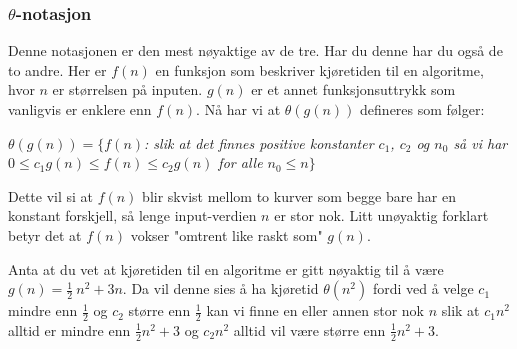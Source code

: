 \subsubsection{$\theta$-notasjon}
Denne notasjonen er den mest nøyaktige av de tre. Har du denne har du også de to andre. Her er $f(n)$ en funksjon som beskriver kjøretiden til en algoritme, hvor $n$ er størrelsen på inputen. $g(n)$ er et annet funksjonsuttrykk som vanligvis er enklere enn $f(n)$. Nå har vi at $\theta(g(n))$ defineres som følger:

\begin{center}
\textit{$\theta(g(n)) = \{ f(n)$: slik at det finnes positive konstanter $c_1$, $c_2$ og $n_0$ så vi har $0 \leq c_1 g(n) \leq f(n) \leq c_2 g(n)$ for alle $n_0 \leq n \}$}
\end{center}

\noindent Dette vil si at $f(n)$ blir skvist mellom to kurver som begge bare har en konstant forskjell, så lenge input-verdien $n$ er stor nok. Litt unøyaktig forklart betyr det at $f(n)$ vokser "omtrent like raskt som" $g(n)$.

\begin{boxed}
Anta at du vet at kjøretiden til en algoritme er gitt nøyaktig til å være $g(n) = \frac{1}{2}\ n^2 + 3n$. Da vil denne sies å ha kjøretid $\theta(n^2)$ fordi ved å velge $c_1$ mindre enn \(\frac{1}{2}\) og $c_2$ større enn \(\frac{1}{2}\) kan vi finne en eller annen stor nok $n$ slik at $c_1 n^2$ alltid er mindre enn \(\frac{1}{2}\)$n^2 + 3$ og $c_2 n^2$ alltid vil være større enn \(\frac{1}{2}\)$n^2 + 3$.
\end{boxed}

